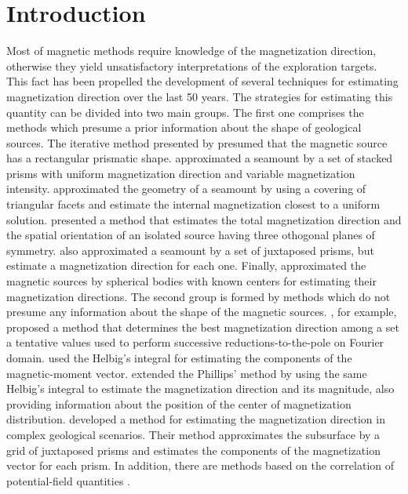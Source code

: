 \chapter{Introduction}

Most of  magnetic methods require knowledge of the magnetization direction, otherwise 
they yield unsatisfactory interpretations of the exploration targets. This fact has 
been propelled the development of several techniques for estimating magnetization 
direction over the last 50 years. The strategies for estimating this quantity can be 
divided into two main groups. The first one comprises the methods which presume a prior 
information about the shape of geological sources. The iterative method presented by 
\cite{bhattacharyya1966} presumed that the magnetic source has a rectangular prismatic shape. 
\cite{emilia_massey_1974} approximated a seamount by a set of stacked 
prisms with uniform magnetization direction and variable magnetization intensity. 
\cite{parker_etal_1987} approximated the geometry of a seamount by using a 
covering of triangular facets and estimate the internal magnetization closest to 
a uniform solution.
\cite{medeiros_silva_1995} presented a method that estimates the total magnetization 
direction and the spatial orientation of an isolated source having three othogonal planes of 
symmetry. 
\cite{kubota2005} also approximated a seamount by a set of juxtaposed prisms, but estimate a 
magnetization direction for each one. 
Finally, \cite{oliveirajr_etal_2015} approximated the magnetic sources by spherical bodies with 
known centers for estimating their magnetization directions. 
The second group is formed by methods which do not presume any information about the shape of the 
magnetic sources. \cite{fedi_etal_1994}, for example, proposed a method that determines the best 
magnetization direction among a set a tentative values used to perform 
successive reductions-to-the-pole on Fourier domain. 
\cite{phillips2005} used the Helbig's integral for estimating the components of the magnetic-moment vector. 
\cite{tontini_pedersen_2008} extended the Phillips' method by using the same Helbig's integral 
to estimate the magnetization direction and its magnitude, also providing information about the position 
of the center of magnetization distribution. \cite{lelievre_oldenburg_2009} developed a method for estimating 
the magnetization direction in complex geological scenarios. Their method approximates the subsurface 
by a grid of juxtaposed prisms and estimates the components of the magnetization vector for each prism.
In addition, there are methods based on the correlation of potential-field quantities \citep[e.g.,][]{dannemiller_li_2006,gerovska_etal_2009,liu_etal_2015,zhang_etal_2018}.

